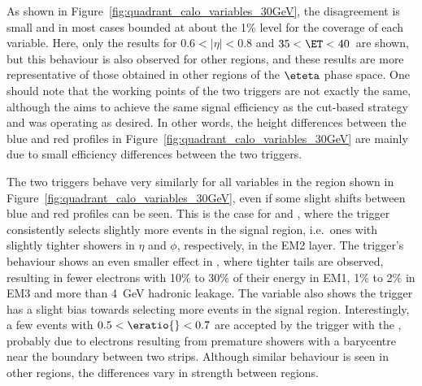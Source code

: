 As shown in Figure~\ref{fig:quadrant_calo_variables_30GeV}, the disagreement is small and in most cases bounded at about the 1\% level for the coverage of each variable. Here, only the results for $0.6<|\eta|<0.8$ and $35<\ET<40$~\GeV are shown, but this behaviour is also observed for other \et{} regions, and these results are more representative of those obtained in other regions of the $\eteta$ phase space. 
One should note that the working points of the two triggers are not exactly the same, although the \rnn{} aims to achieve the same signal efficiency as the cut-based strategy and was operating as desired.  
In other words, 
the height differences between the blue and red profiles in Figure~\ref{fig:quadrant_calo_variables_30GeV} are mainly due to small efficiency differences between the two triggers.




The two triggers behave very similarly for all variables in the region shown in Figure~\ref{fig:quadrant_calo_variables_30GeV}, even if some slight shifts between blue and red profiles can be seen. This is the case for \reta{} and \rphi{}, where the \rnn{} trigger consistently selects slightly more events in the signal region, i.e.\ ones with slightly tighter showers in $\eta{}$ and $\phi{}$, respectively, in the EM2 layer. The \rnn{} trigger's behaviour shows an even smaller effect in \rhad{}, where tighter tails are observed, resulting in fewer electrons with 10\% to 30\% of their energy in EM1, 1\% to 2\% in EM3 and more than 4~GeV hadronic leakage. The \eratio{} variable also shows the \rnn{} trigger has a slight bias towards selecting more events in the signal region. Interestingly, a few events with $0.5<\eratio{}<0.7$ are accepted by the trigger with the \rnn{}, probably due to electrons resulting from premature showers with a barycentre near the boundary between two strips. 
Although similar behaviour is seen in other 
regions, the differences vary in strength between \abseta{} regions. 


